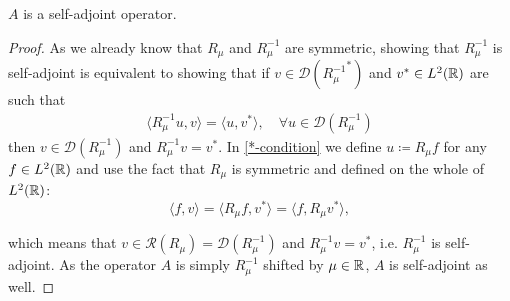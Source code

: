 \begin{theorem} \label{2.3:thm-ASelfAdjoint}
	$A$ is a self-adjoint operator.
		
	\begin{proof}
		As we already know that $R_{\mu}$ and $R_{\mu}^{-1}$ are symmetric, showing that $R_{\mu}^{-1}$ is self-adjoint is equivalent to showing that if $v \in \mathcal{D}({R_{\mu}^{-1}}^{*})$ and $v^{*} \in L^{2}(\mathbb{R})$ are such that
		\begin{align}
			\langle R_{\mu}^{-1} u, v \rangle = \langle u, v^{*} \rangle, \quad \forall u \in \mathcal{D}(R_{\mu}^{-1}) \label{*-condition}
		\end{align}
		then $v \in \mathcal{D}(R_{\mu}^{-1})$ and $R_{\mu}^{-1} v = v^{*}$.
		In \eqref{*-condition} we define $u \coloneqq R_{\mu} f$ for any $f \in L^{2}(\mathbb{R})$ and use the fact that $R_{\mu}$ is symmetric and defined on the whole of $L^{2}(\mathbb{R})$:
		\[  \langle f, v \rangle = \langle R_{\mu} f, v^{*} \rangle = \langle f, R_{\mu} v^{*} \rangle, \]
		
		which means that $v \in \mathcal{R}(R_{\mu}) = \mathcal{D}(R_{\mu}^{-1})$ and $R_{\mu}^{-1} v = v^{*}$, i.e. $R_{\mu}^{-1}$ is self-adjoint. As the operator $A$ is simply $R_{\mu}^{-1}$ shifted by $\mu \in \mathbb{R}$, $A$ is self-adjoint as well.		
	\end{proof}
\end{theorem}